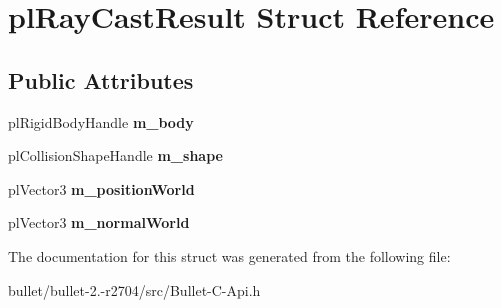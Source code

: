 \hypertarget{structpl_ray_cast_result}{\section{pl\+Ray\+Cast\+Result Struct Reference}
\label{structpl_ray_cast_result}
}
\subsection*{Public Attributes}
\begin{DoxyCompactItemize}
\item 
\hypertarget{structpl_ray_cast_result_a12aec084f7d4f4cd5869055c6d841283}{pl\+Rigid\+Body\+Handle {\bfseries m\+\_\+body}}\label{structpl_ray_cast_result_a12aec084f7d4f4cd5869055c6d841283}

\item 
\hypertarget{structpl_ray_cast_result_a4639ab5e2c00ae360e9453d63a7b8045}{pl\+Collision\+Shape\+Handle {\bfseries m\+\_\+shape}}\label{structpl_ray_cast_result_a4639ab5e2c00ae360e9453d63a7b8045}

\item 
\hypertarget{structpl_ray_cast_result_ade485e5e5fb6e890527e381b14ace099}{pl\+Vector3 {\bfseries m\+\_\+position\+World}}\label{structpl_ray_cast_result_ade485e5e5fb6e890527e381b14ace099}

\item 
\hypertarget{structpl_ray_cast_result_a16f21e8e263d31cbdec7fbc9bc11b38b}{pl\+Vector3 {\bfseries m\+\_\+normal\+World}}\label{structpl_ray_cast_result_a16f21e8e263d31cbdec7fbc9bc11b38b}

\end{DoxyCompactItemize}


The documentation for this struct was generated from the following file\+:\begin{DoxyCompactItemize}
\item 
bullet/bullet-\/2.-\/r2704/src/Bullet-\/\+C-\/\+Api.\+h\end{DoxyCompactItemize}
